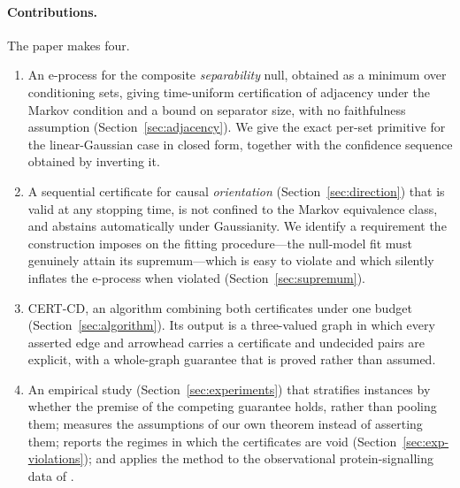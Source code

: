 \documentclass[pdflatex,sn-apa]{sn-jnl}
\theoremstyle{thmstyleone}%
\theoremstyle{thmstyletwo}%
\theoremstyle{thmstylethree}%
\begin{document}
\paragraph{Contributions.} The paper makes four.

\begin{enumerate}
\item An e-process for the composite \emph{separability} null, obtained as a
  minimum over conditioning sets, giving time-uniform certification of
  adjacency under the Markov condition and a bound on separator size, with no
  faithfulness assumption (Section~\ref{sec:adjacency}). We give the exact
  per-set primitive for the linear-Gaussian case in closed form, together with
  the confidence sequence obtained by inverting it.

\item A sequential certificate for causal \emph{orientation}
  (Section~\ref{sec:direction}) that is valid at any stopping time, is not
  confined to the Markov equivalence class, and abstains automatically under
  Gaussianity. We identify a requirement the construction imposes on the
  fitting procedure---the null-model fit must genuinely attain its
  supremum---which is easy to violate and which silently inflates the
  e-process when violated (Section~\ref{sec:supremum}).

\item CERT-CD, an algorithm combining both certificates under one budget
  (Section~\ref{sec:algorithm}). Its output is a three-valued graph in which
  every asserted edge and arrowhead carries a certificate and undecided pairs
  are explicit, with a whole-graph guarantee that is proved rather than
  assumed.

\item An empirical study (Section~\ref{sec:experiments}) that stratifies
  instances by whether the premise of the competing guarantee holds, rather
  than pooling them; measures the assumptions of our own theorem instead of
  asserting them; reports the regimes in which the certificates are void
  (Section~\ref{sec:exp-violations}); and applies the method to the
  observational protein-signalling data of \citet{sachs2005causal}.
\end{enumerate}
\end{document}
